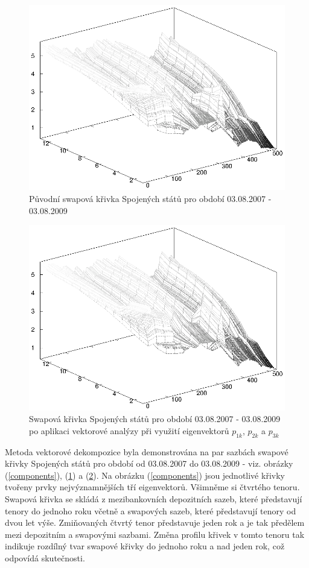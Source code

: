 \documentclass[a4paper]{book}
\begin{document}
\begin{figure}
  \centering
  \includegraphics{irs_orig.eps}
  \caption{Původní swapová křivka Spojených států pro období 03.08.2007 - 03.08.2009}
  \label{irs_orig}
\end{figure}
\begin{figure}
  \centering
  \includegraphics{irs_output.eps}
  \caption{Swapová křivka Spojených států pro období 03.08.2007 - 03.08.2009 po aplikaci vektorové analýzy při využití eigenvektorů $p_{1k}$, $p_{2k}$ a $p_{3k}$}
  \label{irs_output}
\end{figure}
Metoda vektorové dekompozice byla demonstrována na par sazbách swapové křivky Spojených států pro období od 03.08.2007 do 03.08.2009 - viz. obrázky (\ref{components}), (\ref{irs_orig}) a (\ref{irs_output}). Na obrázku (\ref{components}) jsou jednotlivé křivky tvořeny prvky nejvýznamnějších tří eigenvektorů. Všimněme si čtvrtého tenoru. Swapová křivka se skládá z mezibankovních depozitních sazeb, které představují tenory do jednoho roku včetně a swapových sazeb, které představují tenory od dvou let výše. Zmiňovaných čtvrtý tenor představuje jeden rok a je tak předělem mezi depozitním a swapovými sazbami. Změna profilu křivek v tomto tenoru tak indikuje rozdílný tvar swapové křivky do jednoho roku a nad jeden rok, což odpovídá skutečnosti.
\end{document}
